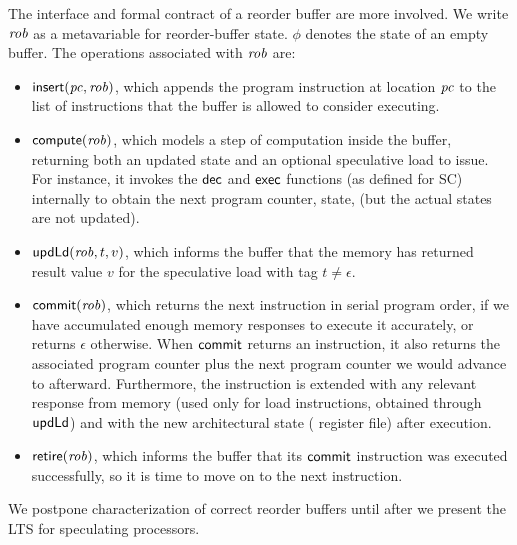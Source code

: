 The interface and formal contract of a reorder buffer are more
involved.  We write $\mathit{rob}$ as a metavariable for reorder-buffer
state. $\phi$ denotes the state of an empty buffer. The operations associated with $\mathit{rob}$ are:
\begin{itemize}
\item $\mathsf{insert}(\mathit{pc}, \mathit{rob})$, which appends the program instruction at location $\mathit{pc}$ to the list of instructions that the buffer is allowed to consider executing.
\item $\mathsf{compute}(\mathit{rob})$, which models a
step of computation inside the buffer, returning both an updated state
and an optional speculative load to issue. For instance, it invokes the $\mathsf{dec}$
and $\mathsf{exec}$ functions (as defined for SC) internally to obtain the next program
counter, state, \etc{} (but the actual states are not updated).
\item $\mathsf{upd}\mathsf{Ld}(\mathit{rob},t,v)$, which informs the buffer that the memory
has returned result value $v$ for the speculative load with tag $t \neq \epsilon$.
\item $\mathsf{commit}(\mathit{rob})$, which returns the next instruction in serial
program order, if we have accumulated enough memory responses to execute it
accurately, or returns
$\epsilon$ otherwise.  When $\mathsf{commit}$ returns an instruction, it also
returns the associated program counter plus the next program counter
we would advance to afterward.
 Furthermore, the instruction is
extended with any relevant response from memory (used only for load
instructions, obtained through $\mathsf{upd}\mathsf{Ld}$) and with the new architectural state (\eg{} register
file) after execution.
\item $\mathsf{retire}(\mathit{rob})$, which informs the buffer that its $\mathsf{commit}$
instruction was executed successfully, so it is time to move on to the
next instruction.
\end{itemize}

We postpone characterization of correct reorder buffers until after we
present the LTS for speculating processors.

